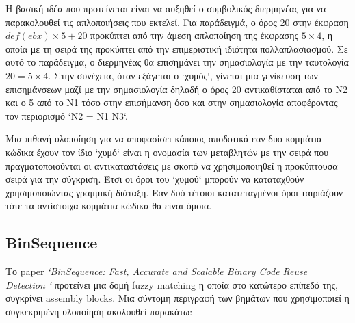 \vspace{-30pt}

Η βασική ιδέα που προτείνεται είναι να αυξηθεί ο συμβολικός διερμηνέας για να παρακολουθεί τις απλοποιήσεις που εκτελεί.
Για παράδειγμά, ο όρος 20 στην έκφραση $def(ebx) \times 5 + 20$ προκύπτει από την άμεση απλοποίηση της έκφρασης $5 \times 4$, η οποία με τη σειρά της προκύπτει από την επιμεριστική ιδιότητα πολλαπλασιασμού.
Σε αυτό το παράδειγμα, ο διερμηνέας θα επισημάνει την σημασιολογία με την ταυτολογία $20 = 5 \times 4$.
Στην συνέχεια, όταν εξάγεται ο `χυμός`, γίνεται μια γενίκευση των επισημάνσεων μαζί με την σημασιολογία δηλαδή ο όρος 20 αντικαθίσταται από το N2 και ο 5 από το N1 τόσο στην επισήμανση όσο και στην σημασιολογία αποφέροντας τον περιορισμό `N2 = N1 \times N3`.

Μια πιθανή υλοποίηση για να αποφασίσει κάποιος αποδοτικά εαν δυο κομμάτια κώδικα έχουν τον ίδιο `χυμό` είναι η ονομασία των μεταβλητών με την σειρά που πραγματοποιούνται οι αντικαταστάσεις με σκοπό να χρησιμοποιηθεί η προκύπτουσα σειρά για την σύγκριση.
Έτσι οι όροι του `χυμού` μπορούν να καταταχθούν χρησιμοποιώντας γραμμική διάταξη.
Εαν δυό τέτοιοι κατατεταγμένοι όροι ταιριάζουν τότε τα αντίστοιχα κομμάτια κώδικα θα είναι όμοια.

\pagebreak
\subsection{BinSequence}

Το paper \emph{`BinSequence: Fast, Accurate and Scalable Binary Code Reuse Detection
`}\cite{huang_binsequence:_2017} προτείνει μια δομή fuzzy matching η οποία στο κατώτερο επίπεδό της, συγκρίνει assembly blocks. Μια σύντομη περιγραφή των βημάτων που χρησιμοποιεί η συγκεκριμένη υλοποίηση ακολουθεί παρακάτω:

